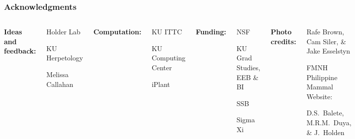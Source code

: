 \begin{frame}
    \frametitle{Acknowledgments}
    \begin{columns}[t]
            {\bf Ideas and feedback:}
            \begin{myitemize}
                \item Holder Lab
                \item KU Herpetology
                \item Melissa Callahan
            \end{myitemize}
            \smallskip
            {\bf Computation:}
            \begin{myitemize}
                \item KU ITTC
                \item KU Computing Center
                \item iPlant
            \end{myitemize}
            {\bf Funding:}
            \begin{myitemize}
                \item NSF
                \item KU Grad Studies, EEB \& BI
                \item SSB
                \item Sigma Xi
            \end{myitemize}
            \smallskip
            {\bf Photo credits:}
            \begin{myitemize}
                \item Rafe Brown, Cam Siler, \& Jake Esselstyn
                \item FMNH Philippine Mammal Website:
                    \begin{myitemize}
                        \item D.S.\ Balete, M.R.M.\ Duya, \& J.\ Holden
                    \end{myitemize}
            \end{myitemize}
    \end{columns}
\end{frame}

